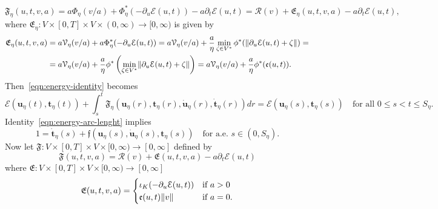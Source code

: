 \documentclass[letterpaper,oneside]{amsart}
\numberwithin{equation}{section}
\theoremstyle{definition}
\DeclarePairedDelimiter{\norm}{\lVert}{\rVert}
\begin{document}
\[
\mathfrak{F}_\eta(u,t,v,a)=a\Phi_\eta(v/a)+\Phi_\eta^*(-\partial_u\mathcal{E}(u,t))-a\partial_t\mathcal{E}(u,t)=\mathcal{R}(v)+\mathfrak{E}_\eta(u,t,v,a)-a\partial_t\mathcal{E}(u,t),
\]
where $\mathfrak{E}_\eta\colon V\times[0,T]\times V\times(0,\infty)\to[0,\infty)$ is given by
\[
\begin{split}
\mathfrak{E}_\eta(u,t,v,a)&=a\mathcal{V}_\eta(v/a)+a\Phi_\eta^*(-\partial_u\mathcal{E}(u,t))=a\mathcal{V}_\eta(v/a)+\frac{a}{\eta}\min_{\zeta\in V^*}\phi^*(\norm{\partial_u\mathcal{E}(u,t)+\zeta})=\\
&=a\mathcal{V}_\eta(v/a)+\frac{a}{\eta}\phi^*\left(\min_{\zeta\in V^*}\norm{\partial_u\mathcal{E}(u,t)+\zeta}\right)=a\mathcal{V}_\eta(v/a)+\frac{a}{\eta}\phi^*(\mathfrak{e}(u,t)).
\end{split}
\]
Then~\eqref{eqn:energy-identity} becomes
\begin{equation*}
\mathcal{E}(\boldsymbol{u}_\eta(t),\boldsymbol{t}_\eta(t))+\int_s^t\mathfrak{F}_\eta(\boldsymbol{u}_\eta(r),\boldsymbol{t}_\eta(r),\dot{\boldsymbol{u}}_\eta(r),\dot{\boldsymbol{t}}_\eta(r))dr=\mathcal{E}(\boldsymbol{u}_\eta(s),\boldsymbol{t}_\eta(s))\quad\text{for all $0\le s<t\le S_\eta$}.
\end{equation*}
Identity~\eqref{eqn:energy-arc-lenght} implies
\begin{equation}
\label{eqn:normalization-rescaling}
1=\dot{\boldsymbol{t}}_\eta(s)+\mathfrak{f}(\boldsymbol{u}_\eta(s),\dot{\boldsymbol{u}}_\eta(s),\boldsymbol{t}_\eta(s))\quad\text{for a.e.\ $s\in(0,S_\eta)$}.
\end{equation}
Now let $\mathfrak{F}\colon V\times[0,T]\times V\times[0,\infty)\to[0,\infty]$ defined by
\[
\mathfrak{F}(u,t,v,a)=\mathcal{R}(v)+\mathfrak{E}(u,t,v,a)-a\partial_t\mathcal{E}(u,t)
\]
where $\mathfrak{E}\colon V\times[0,T]\times V\times[0,\infty)\to[0,\infty]$
\[
\mathfrak{E}(u,t,v,a)=
\begin{cases}
\iota_K(-\partial_u\mathcal{E}(u,t)) & \text{if $a>0$} \\
\mathfrak{e}(u,t)\norm{v} & \text{if $a=0$}.
\end{cases}
\]
\end{document}
